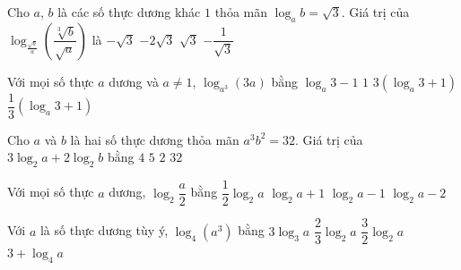 \begin{ex}%
	 Cho $a$, $b$ là các số thực dương khác $1$ thỏa mãn $\log_ab=\sqrt{3}$. Giá trị của $\log_{\tfrac{\sqrt{b}}{a}}\left(\dfrac{\sqrt[3]{b}}{\sqrt{a}}\right)$ là
	\choice 
		 {$-\sqrt{3}$}
		 {$-2\sqrt{3}$}
		 {$\sqrt{3}$}
		{\True  $-\dfrac{1}{\sqrt{3}}$}
\end{ex}

\begin{ex}%
	Với mọi số  thực $a$ dương và $a\ne 1$, $\log_{a^3}(3a)$ bằng
	\choice 
		 {$\log_a3-1$}
		{$1$} 
		{$3(\log_a3+1)$} 
		{\True $\dfrac{1}{3}(\log_a3+1)$} 
\end{ex}

\begin{ex}%
	Cho $a$ và $b$ là  hai số thực dương thỏa mãn $a^3b^2=32$. Giá trị của $3\log_2a+2\log_2b$ bằng
	\choice 
		 {$4$}
		 {\True $5$}
		{$2$} 
		 {$32$}
\end{ex}

\begin{ex}%
	Với mọi số thực $a$ dương,  $\log_2\dfrac{a}{2}$ bằng
	 \choice
		 {$\dfrac{1}{2}\log_2a$}
		{$\log_2a+1$} 
		{\True $\log_2a-1$} 
		 {$\log_2a-2$}
\end{ex}

\begin{ex}%
	Với $a$ là  số thực dương tùy ý, $\log_4(a^3)$ bằng
	 \choice
		 {$3\log_3a$}
		 {$\dfrac{2}{3}\log_2a$}
		{\True  $\dfrac{3}{2}\log_2a$}
		{$3+\log_4a$} 
\end{ex}

